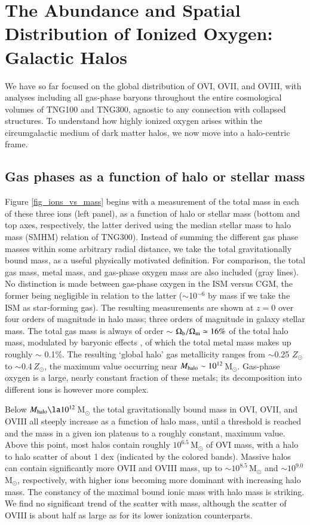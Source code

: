 \documentclass[useAMS,usenatbib]{mnras}
\newcommand{\msun}{\,M$_{\odot}$\xspace}
\newcommand{\ovi}{OVI\xspace}
\newcommand{\ovii}{OVII\xspace}
\newcommand{\oviii}{OVIII\xspace}
\begin{document}
\section{The Abundance and Spatial Distribution of Ionized Oxygen: Galactic Halos} \label{sec_abundance_halos}

We have so far focused on the global distribution of \ovi, \ovii, and \oviii, with analyses including all gas-phase baryons throughout the entire cosmological volumes of TNG100 and TNG300, agnostic to any connection with collapsed structures. To understand how highly ionized oxygen arises within the circumgalactic medium of dark matter halos, we now move into a halo-centric frame.

\subsection{Gas phases as a function of halo or stellar mass}

Figure \ref{fig_ions_vs_mass} begins with a measurement of the total mass in each of these three ions (left panel), as a function of halo or stellar mass (bottom and top axes, respectively, the latter derived using the median stellar mass to halo mass (SMHM) relation of TNG300). Instead of summing the different gas phase masses within some arbitrary radial distance, we take the total gravitationally bound mass, as a useful physically motivated definition. For comparison, the total gas mass, metal mass, and gas-phase oxygen mass are also included (gray lines). No distinction is made between gas-phase oxygen in the ISM versus CGM, the former being negligible in relation to the latter ($\sim$10$^{-6}$ by mass if we take the ISM as star-forming gas). The resulting measurements are shown at $z=0$ over four orders of magnitude in halo mass; three orders of magnitude in galaxy stellar mass. The total gas mass is always of order $\sim$ $\Omega_{\rm b}/\Omega_{\rm m} \simeq 16\%$ of the total halo mass, modulated by baryonic effects \citep[see][]{pillepich17a}, of which the total metal mass makes up roughly $\sim$ 0.1\%. The resulting `global halo' gas metallicity ranges from $\sim$0.25 $Z_{\odot}$ to $\sim$0.4\,$Z_{\odot}$, the maximum value occurring near $M_{\rm halo} \sim 10^{12}$\msun. Gas-phase oxygen is a large, nearly constant fraction of these metals; its decomposition into different ions is however more complex.

Below $M_{\rm halo} \la 10^{12}$\msun the total gravitationally bound mass in \ovi, \ovii, and \oviii all steeply increase as a function of halo mass, until a threshold is reached and the mass in a given ion plateaus to a roughly constant, maximum value. Above this point, most halos contain roughly $10^{6.5}$\msun of \ovi mass, with a halo to halo scatter of about 1 dex (indicated by the colored bands). Massive halos can contain significantly more \ovii and \oviii mass, up to $\sim 10^{8.5}$\msun and $\sim 10^{9.0}$\msun, respectively, with higher ions becoming more dominant with increasing halo mass. The constancy of the maximal bound ionic mass with halo mass is striking. We find no significant trend of the scatter with mass, although the scatter of \oviii is about half as large as for its lower ionization counterparts.
\end{document}

